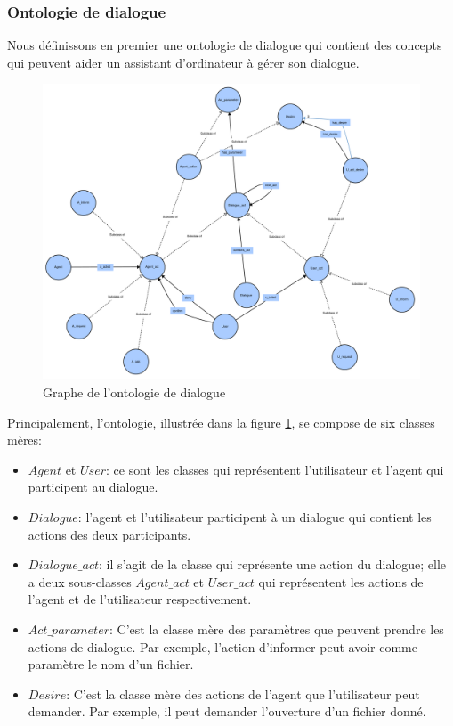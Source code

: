 \subsubsection{Ontologie de dialogue}\label{onto1}
Nous définissons en premier une ontologie de dialogue qui contient des concepts qui peuvent aider un assistant d'ordinateur à gérer son dialogue.
\begin{figure}[H] 
	
	\centering
	\includegraphics[width=1.1\linewidth]{images/Conception/DM/main_onto.png}
	\caption{Graphe de l'ontologie de dialogue}\label{main_onto}
\end{figure}
\par Principalement, l'ontologie, illustrée dans la figure \ref{main_onto}, se compose de six classes mères:
\begin{itemize}
	\item $Agent$ et $User$: ce sont les classes qui représentent l'utilisateur et l'agent qui participent au dialogue.
	\item $Dialogue$: l'agent et l'utilisateur participent à un dialogue qui contient les actions des deux participants.
	\item $Dialogue\_act$: il s'agit de la classe qui représente une action du dialogue; elle a deux sous-classes $Agent\_act$ et $User\_act$ qui représentent les actions de l'agent et de l'utilisateur respectivement.
	\item $Act\_parameter$: C'est la classe mère des paramètres que peuvent prendre les actions de dialogue. Par exemple, l'action d'informer peut avoir comme paramètre le nom d'un fichier.
	\item $Desire$: C'est la classe mère des actions de l'agent que l'utilisateur peut demander. Par exemple, il peut demander l'ouverture d'un fichier donné.
\end{itemize}

